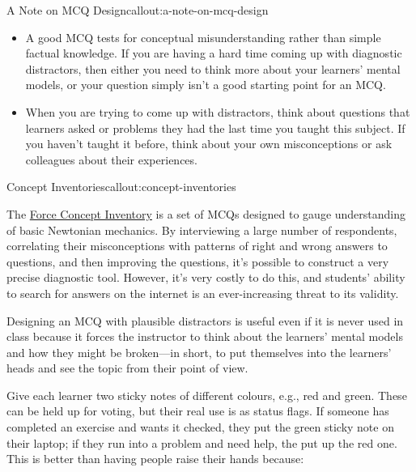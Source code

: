 \begin{callout}{A Note on MCQ Design}{callout:a-note-on-mcq-design}

\begin{itemize}

\item
  A good MCQ tests for conceptual misunderstanding rather than simple
  factual knowledge. If you are having a hard time coming up with
  diagnostic distractors, then either you need to think more about your
  learners' mental models, or your question simply isn't a good starting
  point for an MCQ.

\item
  When you are trying to come up with distractors, think about questions
  that learners asked or problems they had the last time you taught this
  subject. If you haven't taught it before, think about your own
  misconceptions or ask colleagues about their experiences.

\end{itemize}

\end{callout}

\begin{callout}{Concept Inventories}{callout:concept-inventories}

The \href{https://en.wikipedia.org/wiki/Force\_Concept\_Inventory}{Force
Concept Inventory} is a set of MCQs designed to gauge understanding of
basic Newtonian mechanics. By interviewing a large number of
respondents, correlating their misconceptions with patterns of right and
wrong answers to questions, and then improving the questions, it's
possible to construct a very precise diagnostic tool. However, it's very
costly to do this, and students' ability to search for answers on the
internet is an ever-increasing threat to its validity.

\end{callout}

Designing an MCQ with plausible distractors is useful even if it is
never used in class because it forces the instructor to think about
the learners' mental models and how they might be broken---in short,
to put themselves into the learners' heads and see the topic from
their point of view.




Give each learner two sticky notes of different colours, e.g., red and
green. These can be held up for voting, but their real use is as
status flags. If someone has completed an exercise and wants it
checked, they put the green sticky note on their laptop; if they run
into a problem and need help, the put up the red one. This is better
than having people raise their hands because:

